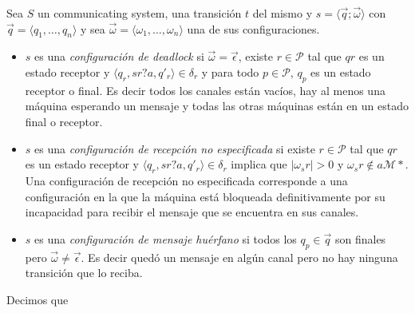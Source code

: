 \begin{definition} Sea $S$ un communicating system, una transición $t$ del mismo y $s= \langle \overrightarrow{q} ; \overrightarrow{\omega} \rangle$ con $\overrightarrow{q}= \langle q_1, \ldots, q_n \rangle$ y sea $\overrightarrow{\omega}= \langle \omega_1, \ldots, \omega_n \rangle$ una de sus configuraciones.
\begin{itemize}
    \item $s$ es una \textit{configuración de deadlock} si $\overrightarrow{\omega} = \overrightarrow{\epsilon}$, existe $r \in \mathcal{P}$ tal que $qr$ es un estado receptor y $\langle q_r,sr?a,q'_r \rangle \in \delta_r$ y para todo $p \in \mathcal{P}$, $q_p$ es un estado receptor o final. Es decir todos los canales están vacíos, hay al menos una máquina esperando un mensaje y todas las otras máquinas están en un estado final o receptor.
    
    \item $s$ es una \textit{configuración de recepción no especificada} si existe $r \in \mathcal{P}$ tal que $qr$ es un estado receptor y $\langle q_r,sr?a,q'_r \rangle \in \delta_r$ implica que $|\omega_sr| > 0$ y $\omega_sr \notin a\mathcal{M}*$. Una configuración de recepción no especificada corresponde a una configuración en la que la máquina está bloqueada definitivamente por su incapacidad para recibir el mensaje que se encuentra en sus canales.
    
    \item $s$ es una \textit{configuración de mensaje huérfano} si todos los $q_p \in \overrightarrow{q}$ son finales pero $\overrightarrow{\omega} \neq \overrightarrow{\epsilon}$. Es decir quedó un mensaje en algún canal pero no hay ninguna transición que lo reciba. 
\end{itemize}
Decimos que 

\end{definition}

